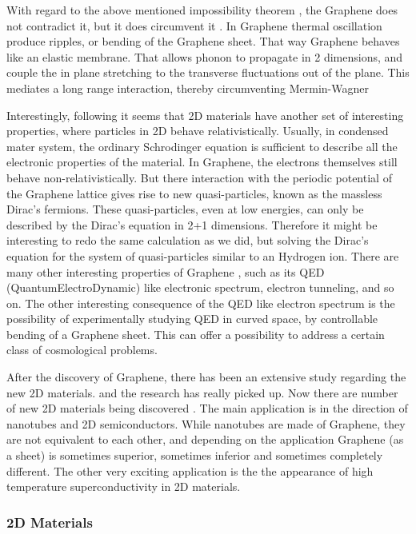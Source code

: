 With regard to the above mentioned impossibility theorem \cite{Mermin2}, the Graphene does not contradict it, but it does circumvent it \cite{GrapheneRiples}. In Graphene thermal oscillation produce ripples, or bending of the Graphene sheet. That way Graphene behaves like an elastic membrane. That allows phonon to propagate in 2 dimensions, and couple the in plane stretching to the transverse fluctuations out of the plane. This mediates a long range interaction, thereby circumventing Mermin-Wagner 

Interestingly, following \cite{Graphene0} it seems that 2D materials have another set of interesting properties, where particles in 2D behave relativistically. Usually, in condensed mater system, the ordinary Schrodinger equation is sufficient to describe all the electronic properties of the material. In Graphene, the electrons themselves still behave non-relativistically. But there interaction with the periodic potential of the Graphene lattice gives rise to new quasi-particles, known as the massless Dirac's fermions. These quasi-particles, even at low energies, can only be described by the Dirac's equation in 2+1 dimensions. Therefore it might be interesting to redo the same calculation as we did, but solving the Dirac's equation for the system of quasi-particles similar to an Hydrogen ion.  There are many other interesting properties of Graphene \cite{Graphene0}, such as its QED (QuantumElectroDynamic) like electronic spectrum, electron tunneling, and so on. The other interesting consequence of the QED like electron spectrum is the possibility of experimentally studying QED in curved space, by controllable bending of a Graphene sheet. This can offer a possibility to address a certain class of cosmological problems. 

After the discovery of Graphene, there has been an extensive study regarding the new 2D materials. and the research has really picked up. Now there are number of new 2D materials being discovered \cite{Many2DMaterials}.  The main application is in the direction of nanotubes and 2D semiconductors. While nanotubes are made of Graphene, they are not equivalent to each other,  and depending on the application Graphene (as a sheet) is sometimes superior, sometimes inferior and sometimes completely different. The other very exciting  application is the the appearance of high temperature superconductivity in 2D materials\cite{2DSuper}.

\subsubsection*{2D Materials}

